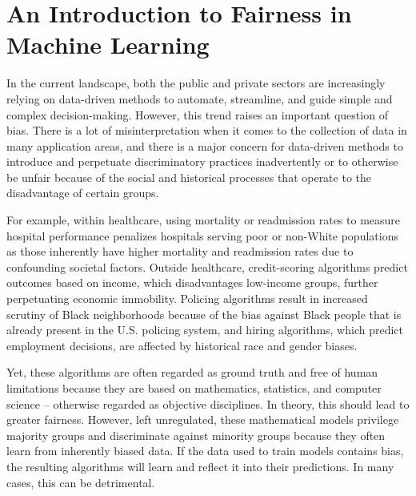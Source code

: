 \documentclass[12pt, twoside]{amherstthesis}
\begin{document}
  \listoftables

  \listoffigures


\mainmatter %
\pagestyle{fancyplain} %

\hypertarget{intro}{%
\chapter{An Introduction to Fairness in Machine Learning}\label{intro}}

In the current landscape, both the public and private sectors are increasingly relying on data-driven methods to automate, streamline, and guide simple and complex decision-making. However, this trend raises an important question of bias. There is a lot of misinterpretation when it comes to the collection of data in many application areas, and there is a major concern for data-driven methods to introduce and perpetuate discriminatory practices inadvertently or to otherwise be unfair because of the social and historical processes that operate to the disadvantage of certain groups.

For example, within healthcare, using mortality or readmission rates to measure hospital performance penalizes hospitals serving poor or non-White populations as those inherently have higher mortality and readmission rates due to confounding societal factors. Outside healthcare, credit-scoring algorithms predict outcomes based on income, which disadvantages low-income groups, further perpetuating economic immobility. Policing algorithms result in increased scrutiny of Black neighborhoods because of the bias against Black people that is already present in the U.S. policing system, and hiring algorithms, which predict employment decisions, are affected by historical race and gender biases.

Yet, these algorithms are often regarded as ground truth and free of human limitations because they are based on mathematics, statistics, and computer science -- otherwise regarded as objective disciplines. In theory, this should lead to greater fairness. However, left unregulated, these mathematical models privilege majority groups and discriminate against minority groups because they often learn from inherently biased data. If the data used to train models contains bias, the resulting algorithms will learn and reflect it into their predictions. In many cases, this can be detrimental.
\end{document}
